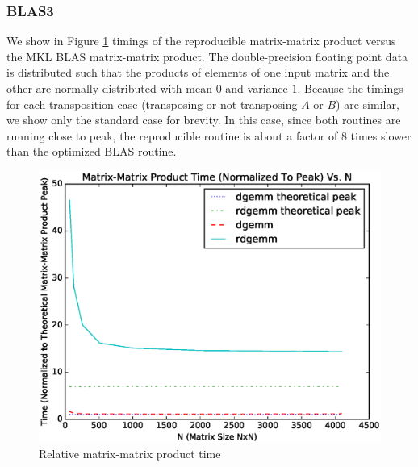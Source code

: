   \subsubsection{BLAS3}
    We show in Figure \ref{fig:gemm_timings} timings of the reproducible matrix-matrix product versus the MKL BLAS matrix-matrix product. The double-precision floating point data is distributed such that the products of elements of one input matrix and the other are normally distributed with mean $0$ and variance $1$. Because the timings for each transposition case (transposing or not transposing $A$ or $B$) are similar, we show only the standard case for brevity. In this case, since both routines are running close to peak, the reproducible routine is about a factor of 8 times slower than the optimized BLAS routine.
  \begin{figure}[H]
  \begin{center}
  \includegraphics[width=\textwidth]{plots/gemm_comparison}
  \caption{Relative matrix-matrix product time}
  \label{fig:gemm_timings}
  \end{center}
  \end{figure}
